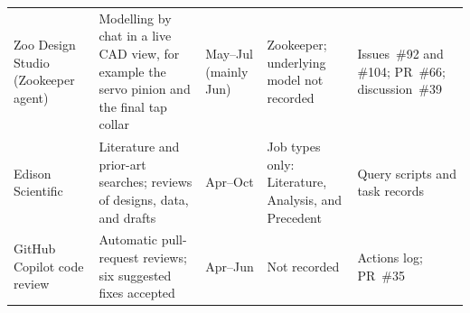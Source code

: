 \begin{table}[htbp]
\begin{tabular}{>{\raggedright\arraybackslash}p{2.5cm}>{\raggedright\arraybackslash}p{4.2cm}>{\raggedright\arraybackslash}p{1.7cm}>{\raggedright\arraybackslash}p{3.4cm}>{\raggedright\arraybackslash}p{2.5cm}}
\addlinespace[2pt]
Zoo Design Studio (Zookeeper agent) & Modelling by chat in a live CAD view,
for example the servo pinion and the final tap collar & May--Jul (mainly Jun) &
Zookeeper; underlying model not recorded & Issues~\#92 and \#104; PR~\#66;
discussion~\#39 \\
\addlinespace[2pt]
Edison Scientific & Literature and prior-art searches; reviews of designs,
data, and drafts & Apr--Oct & Job types only: Literature, Analysis, and
Precedent & Query scripts and task records \\
\addlinespace[2pt]
GitHub Copilot code review & Automatic pull-request reviews; six suggested
fixes accepted & Apr--Jun & Not recorded & Actions log; PR~\#35 \\
\bottomrule
\end{tabular}
\end{table}
